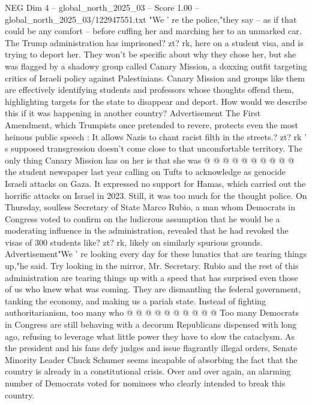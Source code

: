 \begin{textsample}{NEG Dim 4 – global\_north\_2025\_03 – Score 1.00 – global\_north\_2025\_03/122947551.txt}  \label{ex:f4_neg_391}
"We ' re the police,"they say -- as if that could be any comfort -- before cuffing her and marching her to an unmarked car.
The Trump administration has imprisoned? zt? rk, here on a student visa, and is trying to deport her.
They won't be specific about why they chose her, but she was flagged by a shadowy group called Canary Mission, a doxxing outfit targeting critics of Israeli policy against Palestinians.
Canary Mission and groups like them are effectively identifying students and professors whose thoughts offend them, highlighting targets for the state to disappear and deport.
How would we describe this if it was happening in another country?
Advertisement The First Amendment, which Trumpists once pretended to revere, protects even the most heinous public speech : It allows Nazis to chant racist filth in the streets.? zt? rk ' s supposed transgression doesn't come close to that uncomfortable territory.
The only thing Canary Mission has on her is that she was @ @ @ @ @ @ @ @ @ @ the student newspaper last year calling on Tufts to acknowledge as genocide Israeli attacks on Gaza.
It expressed no support for Hamas, which carried out the horrific attacks on Israel in 2023.
Still, it was too much for the thought police.
On Thursday, soulless Secretary of State Marco Rubio, a man whom Democrats in Congress voted to confirm on the ludicrous assumption that he would be a moderating influence in the administration, revealed that he had revoked the visas of 300 students like? zt? rk, likely on similarly spurious grounds.
Advertisement"We ' re looking every day for these lunatics that are tearing things up,"he said.
Try looking in the mirror, Mr.
Secretary.
Rubio and the rest of this administration are tearing things up with a speed that has surprised even those of us who knew what was coming.
They are dismantling the federal government, tanking the economy, and making us a pariah state.
Instead of fighting authoritarianism, too many who @ @ @ @ @ @ @ @ @ @ Too many Democrats in Congress are still behaving with a decorum Republicans dispensed with long ago, refusing to leverage what little power they have to slow the cataclysm.
As the president and his fans defy judges and issue flagrantly illegal orders, Senate Minority Leader Chuck Schumer seems incapable of absorbing the fact that the country is already in a constitutional crisis.
Over and over again, an alarming number of Democrats voted for nominees who clearly intended to break this country.

\end{textsample}
